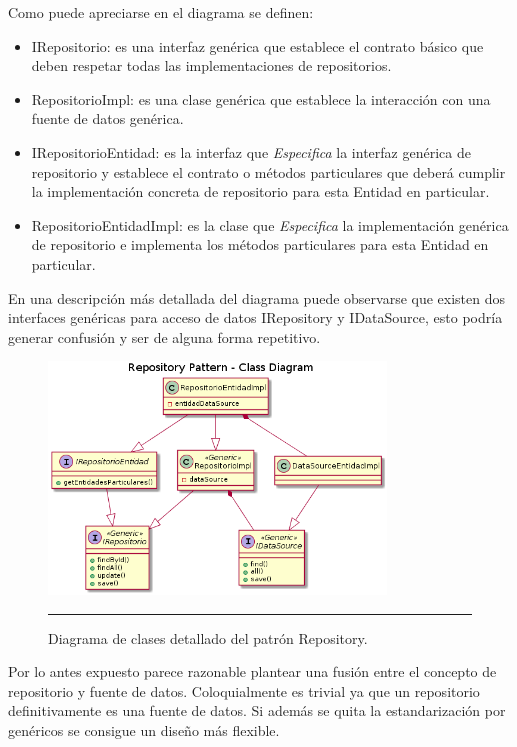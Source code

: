 Como puede apreciarse en el diagrama se definen:
\begin{itemize}
	\item IRepositorio: es una interfaz genérica que establece el contrato básico que deben respetar todas las implementaciones de repositorios.
	\item RepositorioImpl: es una clase genérica que establece la interacción con una fuente de datos genérica.
	\item IRepositorioEntidad: es la interfaz que \textit{Especifica} la interfaz genérica de repositorio y establece el contrato o métodos particulares que deberá cumplir la implementación concreta de repositorio para esta Entidad en particular.
	\item RepositorioEntidadImpl: es la clase que \textit{Especifica} la implementación genérica de repositorio e implementa los métodos particulares para esta Entidad en particular.
\end{itemize}

En una descripción más detallada del diagrama puede observarse que existen dos interfaces genéricas para acceso de datos IRepository y IDataSource, esto podría generar confusión y ser de alguna forma repetitivo.

\begin{figure}[htbp]
	\centering
	\includegraphics[width=0.8\textwidth]{Figures/uml_clases_detalles_repository.png}
	\rule{35em}{1pt}
	\caption[Repository Pattern Detailed Class Diagram]{Diagrama de clases detallado del patrón Repository.}
	\label{fig:uml_clases_detalles_repository}
\end{figure}

 Por lo antes expuesto parece razonable plantear una fusión entre el concepto de repositorio y fuente de datos. Coloquialmente es trivial ya que un repositorio definitivamente es una fuente de datos. Si además se quita la estandarización por genéricos se consigue un diseño más flexible.
 
